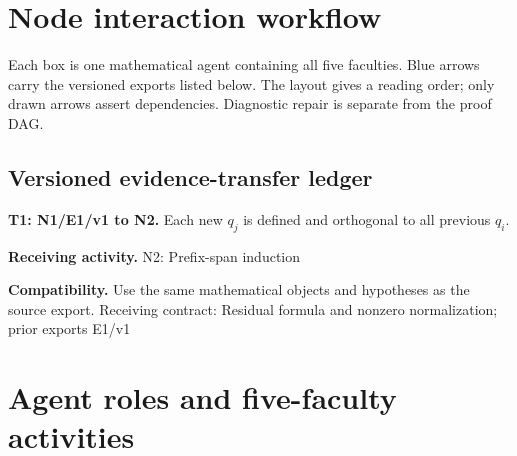 \documentclass[preprint,12pt,aps,pra,showkeys,amsmath,amssymb,superscriptaddress,floatfix]{revtex4-2}
\theoremstyle{definition}
\theoremstyle{remark}
\newcommand{\field}[2]{\par\smallskip\noindent\textbf{#1.} #2\par}
\begin{document}
\clearpage\section{Node interaction workflow}

\begin{center}\end{center}

Each box is one mathematical agent containing all five faculties. Blue
arrows carry the versioned exports listed below. The layout gives a
reading order; only drawn arrows assert dependencies. Diagnostic repair
is separate from the proof DAG.

\subsection{Versioned evidence-transfer ledger}

\begingroup\small\linespread{1.05}\selectfont

\field{T1: N1/E1/v1 to N2}{Each new \(q_j\) is defined and orthogonal to all previous \(q_i\).}

\field{Receiving activity}{N2: Prefix-span induction}

\field{Compatibility}{Use the same mathematical objects and hypotheses as the source export.
Receiving contract: Residual formula and nonzero normalization; prior
exports E1/v1}

\endgroup

\clearpage\section{Agent roles and five-faculty activities}\begingroup\small\linespread{1.05}\selectfont{}
\end{document}
